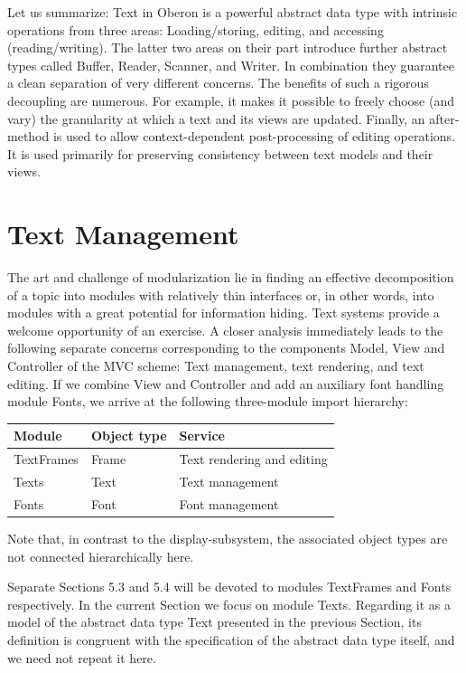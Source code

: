 Let us summarize: Text in Oberon is a powerful abstract data type with intrinsic operations from
three areas: Loading/storing, editing, and accessing (reading/writing). The latter two areas on their
part introduce further abstract types called Buffer, Reader, Scanner, and Writer. In combination
they guarantee a clean separation of very different concerns. The benefits of such a rigorous
decoupling are numerous. For example, it makes it possible to freely choose (and vary) the
granularity at which a text and its views are updated. Finally, an after-method is used to allow
context-dependent post-processing of editing operations. It is used primarily for preserving
consistency between text models and their views.

\section{Text Management}
The art and challenge of modularization lie in finding an effective decomposition of a topic into
modules with relatively thin interfaces or, in other words, into modules with a great potential for
information hiding. Text systems provide a welcome opportunity of an exercise. A closer analysis
immediately leads to the following separate concerns corresponding to the components Model,
View and Controller of the MVC scheme: Text management, text rendering, and text editing. If we
combine View and Controller and add an auxiliary font handling module Fonts, we arrive at the
following three-module import hierarchy:
\begin{table}[h!]
	\begin{tabular}{l l l}
		Module     &Object type &Service \\\hline
		TextFrames &Frame       &Text rendering and editing\\
		Texts      &Text        &Text management \\
		Fonts      &Font        &Font management
	\end{tabular}
\end{table}

Note that, in contrast to the display-subsystem, the associated object types are not connected hierarchically here.

Separate Sections 5.3 and 5.4 will be devoted to modules TextFrames and Fonts respectively. In
the current Section we focus on module Texts. Regarding it as a model of the abstract data type
Text presented in the previous Section, its definition is congruent with the specification of the
abstract data type itself, and we need not repeat it here.

